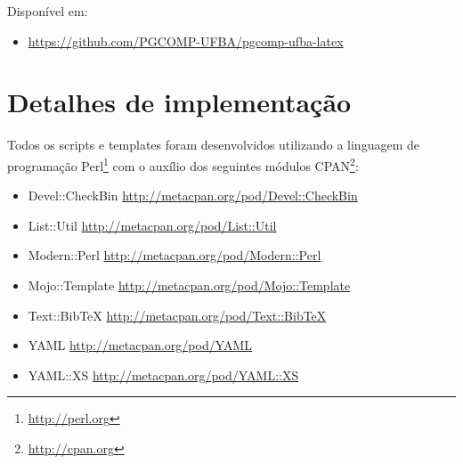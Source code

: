 Disponível em:

\begin{itemize}
  \item \url{https://github.com/PGCOMP-UFBA/pgcomp-ufba-latex}
\end{itemize}

\section{Detalhes de implementação}


Todos os scripts e templates foram desenvolvidos utilizando a linguagem de
programação Perl\footnote{\url{http://perl.org}} com o auxílio dos seguintes
módulos CPAN\footnote{\url{http://cpan.org}}:

\begin{itemize}
  \item Devel::CheckBin \url{http://metacpan.org/pod/Devel::CheckBin}
  \item List::Util \url{http://metacpan.org/pod/List::Util}
  \item Modern::Perl \url{http://metacpan.org/pod/Modern::Perl}
  \item Mojo::Template \url{http://metacpan.org/pod/Mojo::Template}
  \item Text::BibTeX \url{http://metacpan.org/pod/Text::BibTeX}
  \item YAML \url{http://metacpan.org/pod/YAML}
  \item YAML::XS \url{http://metacpan.org/pod/YAML::XS}
\end{itemize}




